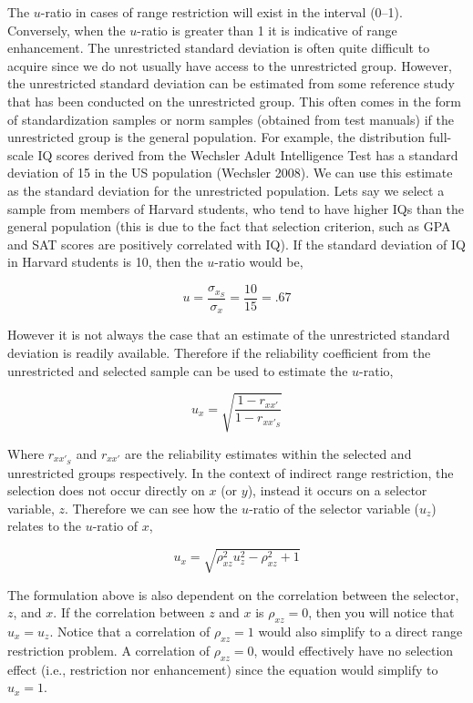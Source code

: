 \documentclass[
  letterpaper,
  DIV=11,
  numbers=noendperiod]{scrreprt}
\begin{document}
The \(u\)-ratio in cases of range restriction will exist in the interval
(0--1). Conversely, when the \(u\)-ratio is greater than 1 it is
indicative of range enhancement. The unrestricted standard deviation is
often quite difficult to acquire since we do not usually have access to
the unrestricted group. However, the unrestricted standard deviation can
be estimated from some reference study that has been conducted on the
unrestricted group. This often comes in the form of standardization
samples or norm samples (obtained from test manuals) if the unrestricted
group is the general population. For example, the distribution
full-scale IQ scores derived from the Wechsler Adult Intelligence Test
has a standard deviation of 15 in the US population (Wechsler 2008). We
can use this estimate as the standard deviation for the unrestricted
population. Lets say we select a sample from members of Harvard
students, who tend to have higher IQs than the general population (this
is due to the fact that selection criterion, such as GPA and SAT scores
are positively correlated with IQ). If the standard deviation of IQ in
Harvard students is 10, then the \(u\)-ratio would be,

\[
u =  \frac{\sigma_{x_S}}{\sigma_x} = \frac{10}{15}= .67
\]

However it is not always the case that an estimate of the unrestricted
standard deviation is readily available. Therefore if the reliability
coefficient from the unrestricted and selected sample can be used to
estimate the \(u\)-ratio,

\[
u_x = \sqrt{\frac{1-r_{xx'}}{1-r_{xx'_S}}}
\]

Where \(r_{xx'_S}\) and \(r_{xx'}\) are the reliability estimates within
the selected and unrestricted groups respectively. In the context of
indirect range restriction, the selection does not occur directly on
\(x\) (or \(y\)), instead it occurs on a selector variable, \(z\).
Therefore we can see how the \(u\)-ratio of the selector variable
(\(u_z\)) relates to the \(u\)-ratio of \(x\),

\[
u_x = \sqrt{\rho_{xz}^2u_z^2 -\rho_{xz}^2 + 1 }
\]

The formulation above is also dependent on the correlation between the
selector, \(z\), and \(x\). If the correlation between \(z\) and \(x\)
is \(\rho_{xz}=0\), then you will notice that \(u_x=u_z\). Notice that a
correlation of \(\rho_{xz}=1\) would also simplify to a direct range
restriction problem. A correlation of \(\rho_{xz}=0\), would effectively
have no selection effect (i.e., restriction nor enhancement) since the
equation would simplify to \(u_x=1\).
\end{document}
